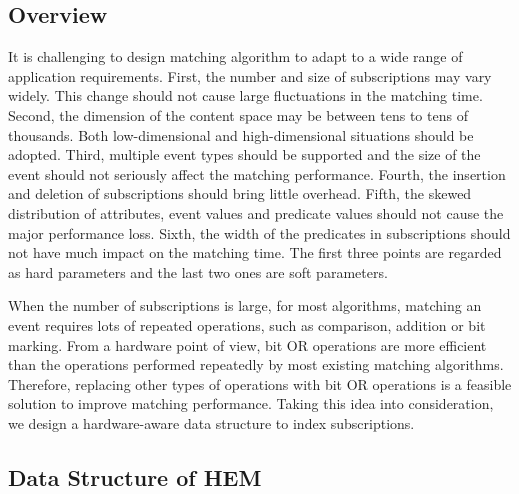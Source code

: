 \documentclass[runningheads]{llncs}
\begin{document}
\subsection{Overview}
It is challenging to design matching algorithm to adapt to a wide range of application requirements. 
First, the number and size of subscriptions may vary widely. This change should not cause large fluctuations in the matching time.
Second, the dimension of the content space may be between tens to tens of thousands. Both low-dimensional and high-dimensional situations should be adopted. 
Third, multiple event types should be supported and the size of the event should not seriously affect the matching performance. 
Fourth, the insertion and deletion of subscriptions should bring little overhead.
Fifth, the skewed distribution of attributes, event values and predicate values should not cause the major performance loss. 
Sixth, the width of the predicates in subscriptions should not have much impact on the matching time. 
The first three points are regarded as hard parameters and the last two ones are soft parameters. 


When the number of subscriptions is large, for most algorithms, matching an event requires lots of repeated operations, such as comparison, addition or bit marking. 
From a hardware point of view, bit OR operations are more efficient than the operations performed repeatedly by most existing matching algorithms.
Therefore, replacing other types of operations with bit OR operations is a feasible solution to improve matching performance. 
Taking this idea into consideration, we design a hardware-aware data structure to index subscriptions. 


\subsection{Data Structure of HEM}
\end{document}
